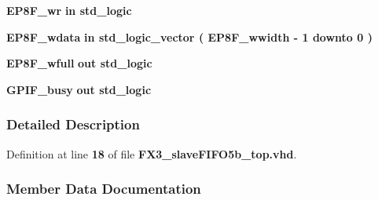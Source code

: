 \begin{DoxyCompactItemize}
\item 
{\bf E\+P8\+F\+\_\+wr}  {\bfseries {\bfseries \textcolor{keywordflow}{in}\textcolor{vhdlchar}{ }}} {\bfseries \textcolor{comment}{std\+\_\+logic}\textcolor{vhdlchar}{ }} 
\item 
{\bf E\+P8\+F\+\_\+wdata}  {\bfseries {\bfseries \textcolor{keywordflow}{in}\textcolor{vhdlchar}{ }}} {\bfseries \textcolor{comment}{std\+\_\+logic\+\_\+vector}\textcolor{vhdlchar}{ }\textcolor{vhdlchar}{(}\textcolor{vhdlchar}{ }\textcolor{vhdlchar}{ }\textcolor{vhdlchar}{ }\textcolor{vhdlchar}{ }{\bfseries {\bf E\+P8\+F\+\_\+wwidth}} \textcolor{vhdlchar}{-\/}\textcolor{vhdlchar}{ } \textcolor{vhdldigit}{1} \textcolor{vhdlchar}{ }\textcolor{keywordflow}{downto}\textcolor{vhdlchar}{ }\textcolor{vhdlchar}{ } \textcolor{vhdldigit}{0} \textcolor{vhdlchar}{ }\textcolor{vhdlchar}{)}\textcolor{vhdlchar}{ }} 
\item 
{\bf E\+P8\+F\+\_\+wfull}  {\bfseries {\bfseries \textcolor{keywordflow}{out}\textcolor{vhdlchar}{ }}} {\bfseries \textcolor{comment}{std\+\_\+logic}\textcolor{vhdlchar}{ }} 
\item 
{\bf G\+P\+I\+F\+\_\+busy}  {\bfseries {\bfseries \textcolor{keywordflow}{out}\textcolor{vhdlchar}{ }}} {\bfseries \textcolor{comment}{std\+\_\+logic}\textcolor{vhdlchar}{ }} 
\end{DoxyCompactItemize}


\subsubsection{Detailed Description}


Definition at line {\bf 18} of file {\bf F\+X3\+\_\+slave\+F\+I\+F\+O5b\+\_\+top.\+vhd}.



\subsubsection{Member Data Documentation}
\paragraph[{altera\+\_\+mf}]{\hspace{0.3cm}{\ttfamily [Library]}}\label{classFX3__slaveFIFO5b__top_ad57cd8d31a38ff87ac163fb47757ffbf}


